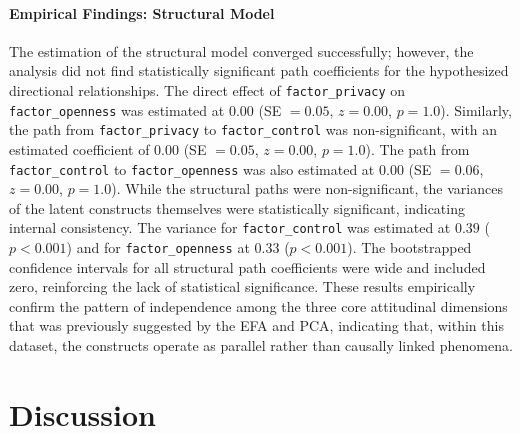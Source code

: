 	\paragraph{Empirical Findings: Structural Model}
	The estimation of the structural model converged successfully; however, the analysis did not find statistically significant path coefficients for the hypothesized directional relationships. The direct effect of \texttt{factor\_privacy} on \texttt{factor\_openness} was estimated at $0.00$ (SE $= 0.05$, $z = 0.00$, $p = 1.0$). Similarly, the path from \texttt{factor\_privacy} to \texttt{factor\_control} was non-significant, with an estimated coefficient of $0.00$ (SE $= 0.05$, $z = 0.00$, $p = 1.0$). The path from \texttt{factor\_control} to \texttt{factor\_openness} was also estimated at $0.00$ (SE $= 0.06$, $z = 0.00$, $p = 1.0$).
	While the structural paths were non-significant, the variances of the latent constructs themselves were statistically significant, indicating internal consistency. The variance for \texttt{factor\_control} was estimated at $0.39$ ($p < 0.001$) and for \texttt{factor\_openness} at $0.33$ ($p < 0.001$). The bootstrapped confidence intervals for all structural path coefficients were wide and included zero, reinforcing the lack of statistical significance. These results empirically confirm the pattern of independence among the three core attitudinal dimensions that was previously suggested by the EFA and PCA, indicating that, within this dataset, the constructs operate as parallel rather than causally linked phenomena.

\section{Discussion}
